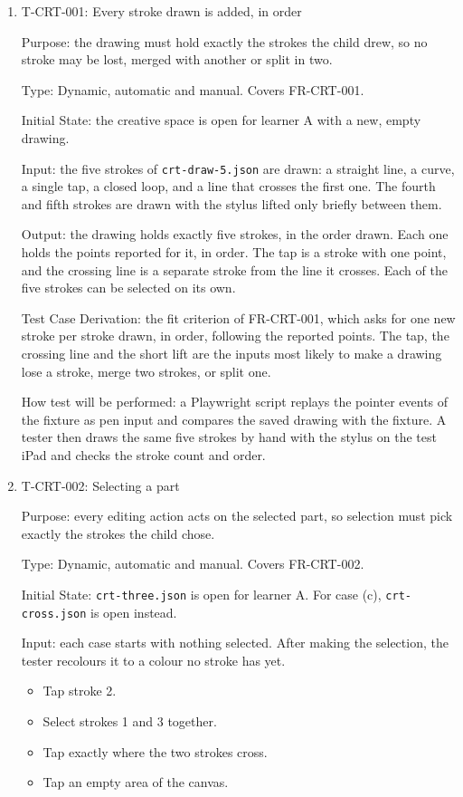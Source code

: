 \documentclass[12pt, titlepage]{article}
\newcommand{\testitem}[1]{\item #1\par\nopagebreak}
\begin{document}
\begin{enumerate}

\testitem{T-CRT-001: Every stroke drawn is added, in order}

Purpose: the drawing must hold exactly the strokes the child drew, so no
stroke may be lost, merged with another or split in two.

Type: Dynamic, automatic and manual. Covers FR-CRT-001.

Initial State: the creative space is open for learner A with a new, empty
drawing.

Input: the five strokes of \texttt{crt-draw-5.json} are drawn: a straight
line, a curve, a single tap, a closed loop, and a line that crosses the first
one. The fourth and fifth strokes are drawn with the stylus lifted only
briefly between them.

Output: the drawing holds exactly five strokes, in the order drawn. Each one
holds the points reported for it, in order. The tap is a stroke with one
point, and the crossing line is a separate stroke from the line it crosses.
Each of the five strokes can be selected on its own.

Test Case Derivation: the fit criterion of FR-CRT-001, which asks for one new
stroke per stroke drawn, in order, following the reported points. The tap,
the crossing line and the short lift are the inputs most likely to make a
drawing lose a stroke, merge two strokes, or split one.

How test will be performed: a Playwright script replays the pointer events of
the fixture as pen input and compares the saved drawing with the fixture. A
tester then draws the same five strokes by hand with the stylus on the test
iPad and checks the stroke count and order.

\testitem{T-CRT-002: Selecting a part}

Purpose: every editing action acts on the selected part, so selection must
pick exactly the strokes the child chose.

Type: Dynamic, automatic and manual. Covers FR-CRT-002.

Initial State: \texttt{crt-three.json} is open for learner A. For case (c),
\texttt{crt-cross.json} is open instead.

Input: each case starts with nothing selected. After making the selection,
the tester recolours it to a colour no stroke has yet.
\begin{itemize}
\item[(a)] Tap stroke 2.
\item[(b)] Select strokes 1 and 3 together.
\item[(c)] Tap exactly where the two strokes cross.
\item[(d)] Tap an empty area of the canvas.
\end{itemize}


\end{enumerate}
\end{document}
